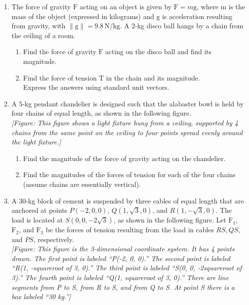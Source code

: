 \documentclass{exercises}
\begin{document}
\begin{enumerate}[resume]
\begin{enumerate}[label=(\alph*)]
\end{enumerate}
\item The force of gravity $\text{F}$ acting on an object is given by $\text{F}=m\text{g}$, where m is the mass of the object (expressed in kilograms) and $\text{g}$ is acceleration resulting from gravity, with $\|\text{g}\|=9.8\,\text{N/kg}$. A 2-kg disco ball hangs by a chain from the ceiling of a room.
\begin{enumerate}[label=(\alph*)]
  \item Find the force of gravity $\text{F}$ acting on the disco ball and find its magnitude.
  \item Find the force of tension $\text{T}$ in the chain and its magnitude.\\ Express the answers using standard unit vectors.
\end{enumerate}
\item A 5-kg pendant chandelier is designed such that the alabaster bowl is held by four chains of equal length, as shown in the following figure. \\ \textit{[Figure: This figure shows a light fixture hung from a ceiling, supported by 4 chains from the same point on the ceiling to four points spread evenly around the light fixture.]}
\begin{enumerate}[label=(\alph*)]
  \item Find the magnitude of the force of gravity acting on the chandelier.
  \item Find the magnitudes of the forces of tension for each of the four chains (assume chains are essentially vertical).
\end{enumerate}
\item \techrequired A 30-kg block of cement is suspended by three cables of equal length that are anchored at points $P(-2,0,0)$, $Q(1,\sqrt{3},0)$, and $R(1,-\sqrt{3},0)$. The load is located at $S(0,0,-2\sqrt{3})$, as shown in the following figure. Let $\text{F}_{1}$, $\text{F}_{2}$, and $\text{F}_{3}$ be the forces of tension resulting from the load in cables $RS,QS$, and $PS$, respectively. \\ \textit{[Figure: This figure is the 3-dimensional coordinate system. It has 4 points drawn. The first point is labeled ``P(-2, 0, 0).'' The second point is labeled ``R(1, -squareroot of 3, 0).'' The third point is labeled ``S(0, 0, -2squareroot of 3).'' The fourth point is labeled ``Q(1, squareroot of 3, 0).'' There are line segments from P to S, from R to S, and from Q to S. At point S there is a box labeled ``30 kg.'']}

\end{enumerate}
\end{document}
